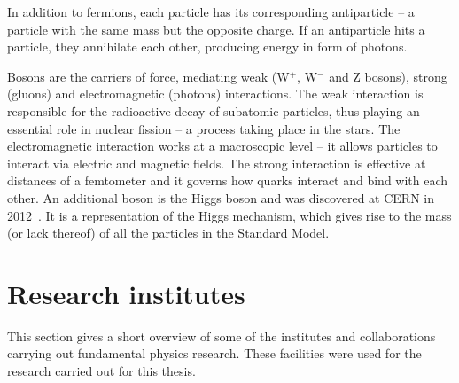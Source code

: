 \begin{description}
In addition to fermions, each particle has its corresponding antiparticle -- a particle with the same mass but the opposite charge. If an antiparticle hits a particle, they annihilate each other, producing energy in form of photons. 

Bosons are the carriers of force, mediating weak (W$^+$, W$^-$ and Z bosons), strong (gluons) and electromagnetic (photons) interactions. The weak interaction is responsible for the radioactive decay of subatomic particles, thus playing an essential role in nuclear fission -- a process taking place in the stars. The electromagnetic interaction works at a macroscopic level -- it allows particles to interact via electric and magnetic fields. The strong interaction is effective at distances of a femtometer and it governs how quarks interact and bind with each other. An additional boson is the Higgs boson and was discovered at CERN in 2012~\cite{}. It is a representation of the Higgs mechanism, which gives rise to the mass (or lack thereof) of all the particles in the Standard Model.
\end{description}

\section{Research institutes}
This section gives a short overview of some of the institutes and collaborations carrying out fundamental physics research. These facilities were used for the research carried out for this thesis. 



